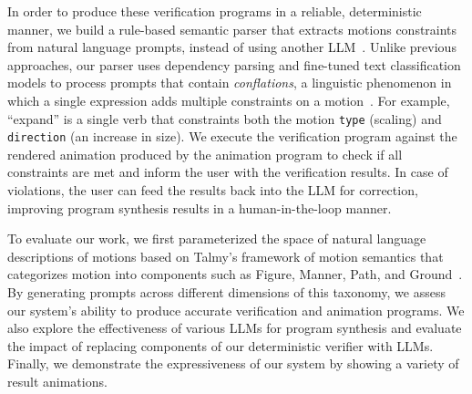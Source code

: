 In order to produce these verification programs in a reliable,
deterministic manner, we build a rule-based semantic parser that
extracts motions constraints from natural language prompts, instead of
using another LLM~\cite{brown2024large}.
Unlike previous approaches, our parser uses dependency parsing and
fine-tuned text classification models to process prompts that contain
\textit{conflations}, a linguistic phenomenon in which a single
expression adds multiple constraints on a
motion~\cite{talmy1975motion}.  For example, ``expand'' is a single
verb that constraints both the motion \texttt{type} (scaling) and
\texttt{direction} (an increase in size).
We execute the verification program against the rendered animation
produced by the animation program to check if all constraints are met
and inform the user with the verification results.  In case of
violations, the user can feed the results back into the LLM for
correction, improving program synthesis results in a human-in-the-loop
manner.

To evaluate our work, we first parameterized the space of natural
language descriptions of motions based on Talmy's framework of motion
semantics that categorizes motion into components such as Figure,
Manner, Path, and Ground~\cite{talmy1975motion}.  By generating
prompts across different dimensions of this taxonomy, we assess our
system's ability to produce accurate verification and animation
programs.  We also explore the effectiveness of various LLMs for
program synthesis and evaluate the impact of replacing components of
our deterministic verifier with LLMs.   Finally, we demonstrate the expressiveness of our system by
showing a variety of result animations.  

